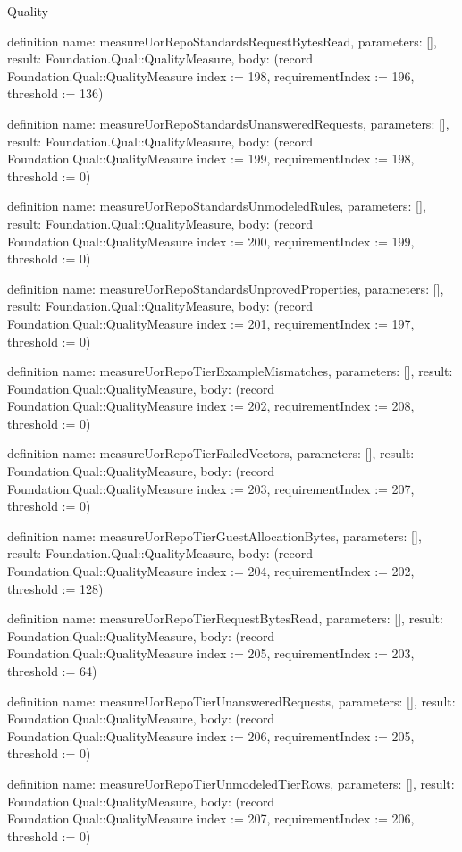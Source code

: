 \begin{lexlean}{Quality}
\begin{semanticmodule}
definition{
  name: measureUorRepoStandardsRequestBytesRead,
  parameters: [],
  result: Foundation.Qual::QualityMeasure,
  body: (record Foundation.Qual::QualityMeasure {index := 198, requirementIndex := 196, threshold := 136})
}

definition{
  name: measureUorRepoStandardsUnansweredRequests,
  parameters: [],
  result: Foundation.Qual::QualityMeasure,
  body: (record Foundation.Qual::QualityMeasure {index := 199, requirementIndex := 198, threshold := 0})
}

definition{
  name: measureUorRepoStandardsUnmodeledRules,
  parameters: [],
  result: Foundation.Qual::QualityMeasure,
  body: (record Foundation.Qual::QualityMeasure {index := 200, requirementIndex := 199, threshold := 0})
}

definition{
  name: measureUorRepoStandardsUnprovedProperties,
  parameters: [],
  result: Foundation.Qual::QualityMeasure,
  body: (record Foundation.Qual::QualityMeasure {index := 201, requirementIndex := 197, threshold := 0})
}

definition{
  name: measureUorRepoTierExampleMismatches,
  parameters: [],
  result: Foundation.Qual::QualityMeasure,
  body: (record Foundation.Qual::QualityMeasure {index := 202, requirementIndex := 208, threshold := 0})
}

definition{
  name: measureUorRepoTierFailedVectors,
  parameters: [],
  result: Foundation.Qual::QualityMeasure,
  body: (record Foundation.Qual::QualityMeasure {index := 203, requirementIndex := 207, threshold := 0})
}

definition{
  name: measureUorRepoTierGuestAllocationBytes,
  parameters: [],
  result: Foundation.Qual::QualityMeasure,
  body: (record Foundation.Qual::QualityMeasure {index := 204, requirementIndex := 202, threshold := 128})
}

definition{
  name: measureUorRepoTierRequestBytesRead,
  parameters: [],
  result: Foundation.Qual::QualityMeasure,
  body: (record Foundation.Qual::QualityMeasure {index := 205, requirementIndex := 203, threshold := 64})
}

definition{
  name: measureUorRepoTierUnansweredRequests,
  parameters: [],
  result: Foundation.Qual::QualityMeasure,
  body: (record Foundation.Qual::QualityMeasure {index := 206, requirementIndex := 205, threshold := 0})
}

definition{
  name: measureUorRepoTierUnmodeledTierRows,
  parameters: [],
  result: Foundation.Qual::QualityMeasure,
  body: (record Foundation.Qual::QualityMeasure {index := 207, requirementIndex := 206, threshold := 0})
}


\end{semanticmodule}
\end{lexlean}
